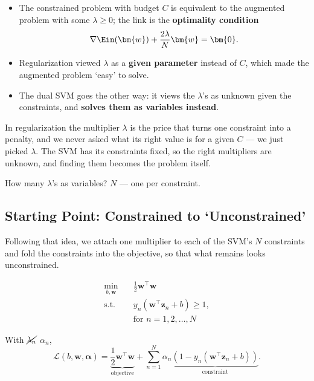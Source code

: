 \begin{itemize}
    \item The constrained problem with budget \(C\) is equivalent to the
        augmented problem with some \(\lambda \ge 0\); the link is the
        \textbf{optimality condition}
        \[
            \nabla \Ein(\bm{w}) + \frac{2\lambda}{N} \bm{w} = \bm{0}.
        \]
    \item Regularization viewed \(\lambda\) as a \textbf{given parameter}
        instead of \(C\), which made the augmented problem `easy' to solve.
    \item The dual SVM goes the other way: it views the \(\lambda\)'s as
        unknown given the constraints, and \textbf{solves them as variables
        instead}.
\end{itemize}

In regularization the multiplier \(\lambda\) is the price that turns one
constraint into a penalty, and we never asked what its right value is for a
given \(C\) --- we just picked \(\lambda\). The SVM has its constraints
fixed, so the right multipliers are unknown, and finding them becomes the
problem itself.

\begin{moral}
    How many \(\lambda\)'s as variables? \(N\) --- one per constraint.
\end{moral}

\subsection{Starting Point: Constrained to `Unconstrained'}

Following that idea, we attach one multiplier to each of the SVM's \(N\)
constraints and fold the constraints into the objective, so that what
remains looks unconstrained.

\begin{center}
    \begin{minipage}[c]{0.38\textwidth}
        \[
            \begin{aligned}
                \min_{b, \bm{w}} \quad & \frac{1}{2} \bm{w}^\top \bm{w}\\
                \text{s.t.} \quad & y_n (\bm{w}^\top \bm{z}_n + b) \ge 1,\\
                & \text{for } n = 1, 2, \dots , N
            \end{aligned}
        \]
    \end{minipage}%
    \hfill
    \begin{minipage}[c]{0.58\textwidth}
        \begin{definition}
            With  \(\cancel{\lambda_n}\)
            \(\alpha_n\),
            \[
                \mathcal{L}(b, \bm{w}, \bm{\alpha}) =
                \underbrace{\frac{1}{2} \bm{w}^\top \bm{w}}_{\text{objective}}
                + \sum_{n=1}^N \alpha_n \underbrace{\left( 1 - y_n
                (\bm{w}^\top \bm{z}_n + b) \right)}_{\text{constraint}}.
            \]
        \end{definition}
    \end{minipage}
\end{center}

